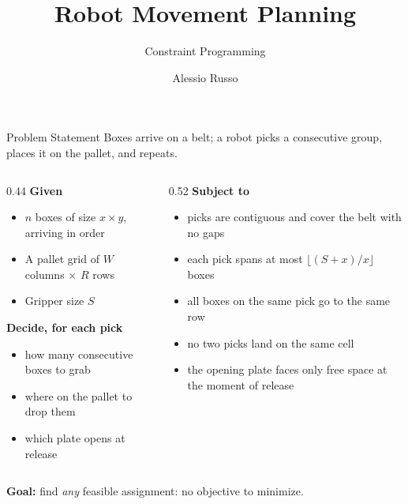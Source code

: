 \documentclass[aspectratio=169,xcolor=dvipsnames]{beamer}
\title{Robot Movement Planning}
\subtitle{Constraint Programming}
\author{Alessio Russo}
\institute{
    Department of Mathematical, Physical and Computer Sciences\\
    University of Parma
}
\date{}
\begin{document}
\begin{frame}
    \titlepage
\end{frame}


\begin{frame}{Problem Statement}
    \small
    Boxes arrive on a belt; a robot picks a consecutive group, places it on the pallet, and repeats.

    \vspace{0.25cm}
    \begin{columns}[T,totalwidth=\textwidth]
        \begin{column}{0.44\textwidth}
            \textbf{Given}
            \begin{itemize}
                \item $n$ boxes of size $x \times y$, arriving in order
                \item A pallet grid of $W$ columns $\times$ $R$ rows
                \item Gripper size $S$
            \end{itemize}

            \vspace{0.2cm}
            \textbf{Decide, for each pick}
            \begin{itemize}
                \item how many consecutive boxes to grab
                \item where on the pallet to drop them
                \item which plate opens at release
            \end{itemize}
        \end{column}
        \begin{column}{0.52\textwidth}
            \textbf{Subject to}
            \begin{itemize}
                \item picks are contiguous and cover the belt with no gaps
                \item each pick spans at most $\lfloor(S+x)/x\rfloor$ boxes
                \item all boxes on the same pick go to the same row
                \item no two picks land on the same cell
                \item the opening plate faces only free space at the moment of release
            \end{itemize}
        \end{column}
    \end{columns}

    \vspace{0.2cm}
    \textbf{Goal:} find \emph{any} feasible assignment: no objective to minimize.
\end{frame}
\end{document}
